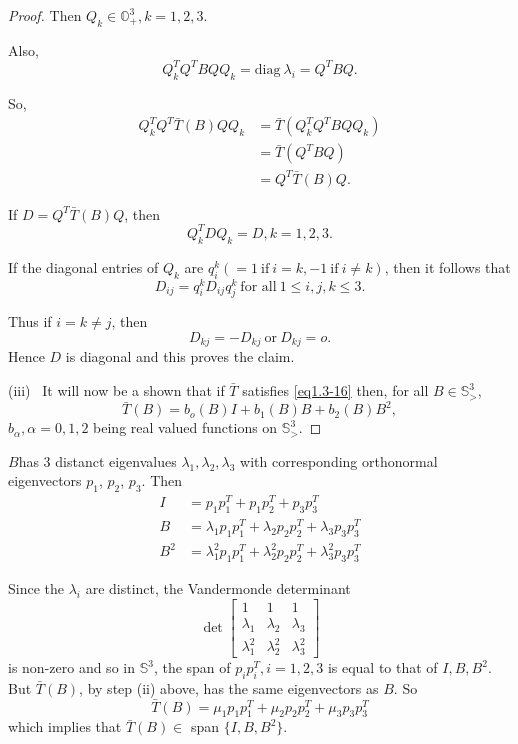 \begin{proof}
   Then $Q_k \in \mathbb{O}^3_+, k= 1, 2, 3$. 
   
   Also,\pageoriginale 
   $$
   Q^T_k Q^T BQQ_k= \text{diag}~ \lambda_i = Q^T BQ. 
   $$

   So, 
   \begin{align*}
     Q^T_k Q^T \bar{T}(B) QQ_k &= \bar{T}(Q_k^T Q^T BQQ_k)\\
     &=\bar{T}(Q^T BQ)\\
     &= Q^T \bar{T}(B) Q. 
   \end{align*} 

   If $D=Q^T \bar{T}(B) Q$, then
   $$
   Q^T_k DQ_k = D, k= 1, 2, 3. 
   $$

   If the diagonal entries of $Q_k$ are $q^k_i(=1 ~\text{if}~ i=k, -1
   ~\text{if}~ i \neq k)$, then it follows that  
   $$
   D_{ij}= q^k_i D_{ij} q^k_j ~\text{for all}~ 1 \leq i, j, k \leq 3. 
   $$ 

   Thus if $i =k \neq j$, then 
   $$
   D_{kj}=- D_{kj} ~\text{or}~ D_{kj}=o. 
   $$
   Hence $D$ is diagonal and this proves the claim. 

\medskip   
 (iii)~ It will now be a shown that if $\bar{T}$ satisfies \eqref{eq1.3-16}
   then, for all $B \in \mathbb{S}^3_>$,  
   \begin{equation*}
     \bar{T}(B)= b_o(B) I + b_1(B)B+b_2(B)B^2, \tag{1.3-17}\label{eq1.3-17}
   \end{equation*} 
   $b_\alpha, \alpha = 0, 1, 2$ being real valued functions on
   $\mathbb{S}^3_>. $ 
 \end{proof}

\begin{case}\label{chap1-sec1.3-case1} %
 $B$\pageoriginale has 3 distanct eigenvalues $\lambda_1, \lambda_2,
  \lambda_3$ with corresponding orthonormal eigenvectors $p_1$,
  $p_2$, $p_3$. Then  
  \begin{align*}
    I & = p_1 p_1^T +p_1 p_2^T + p_3 p_3^T \tag{1.3-18}\label{eq1.3-18}\\
    B &=\lambda_1 p_1 p_1^T + \lambda_2 p_2p_2^T + \lambda_3 p_3 p_3^T
    \tag{1.3-19}\label{eq1.3-19} \\
    B^2 & = \lambda_1^2 p_1 p_1^T + \lambda_2^2 p_2p_2^T + \lambda_3^2 p_3
    p_3^T \tag{1.3-20} \label{eq1.3-20}
  \end{align*}
\end{case}

Since the $\lambda_i$ are distinct, the Vandermonde determinant
$$
\det
\begin{bmatrix}
1 & 1 & 1\\
\lambda_1 &\lambda_2 &\lambda_3\\
\lambda^2_1 &\lambda^2_2 &\lambda_3^2
 \end{bmatrix}
 $$ 
is non-zero and so in $\mathbb{S}^3$, the span of $p_i p_i^T, i= 1, 2,
3$ is equal to that of $I, B, B^2$. But $\bar{T}(B)$, by step (ii)
above, has the same eigenvectors as $B$. So  
 \begin{equation*}
   \bar{T}(B)= \mu_1 p_1p_1^T + \mu_2 p_2p_2^T + \mu_3p_3 p_3^T
   \tag{1.3-21}\label{eq1.3-21} 
 \end{equation*} 
 which implies that $\bar{T}(B) \in$ span $\{I, B, B^2 \}$. 

